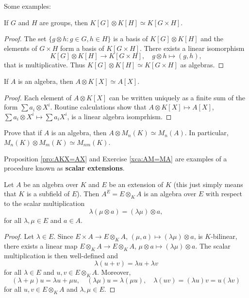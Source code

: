 Some examples:

\begin{proposition}
	If $G$ and $H$ are groups, then $K[G]\otimes K[H]\simeq K[G\times H]$.
\end{proposition}

\begin{proof}
	The set $\{g\otimes h:g\in G,h\in H\}$ is a basis of $K[G]\otimes K[H]$ and 
	the elements of $G\times H$ form a basis of $K[G\times H]$. There exists a linear isomorphism 
	\[
	K[G]\otimes K[H]\to K[G\times H], 
	\quad 
	g\otimes h\mapsto (g,h),
	\]
	that is multiplicative. Thus $K[G]\otimes K[H]\simeq K[G\times H]$
	as algebras. 
\end{proof}

\begin{proposition}
\label{pro:AKX=AX}
	If $A$ is an algebra, then $A\otimes K[X]\simeq A[X]$.	
\end{proposition}

\begin{proof}
	Each element of $A\otimes K[X]$ can be written uniquely as a finite sum of
	the form $\sum a_i\otimes X^i$. Routine calculations show that 
	$A\otimes K[X]\mapsto A[X]$, $\sum a_i\otimes X^i\mapsto \sum a_iX^i$, is a 
	linear algebra isomprhism. 
\end{proof}

\begin{exercise}
\label{xca:AM=MA}
	Prove that if $A$ is an algebra, then $A\otimes M_n(K)\simeq M_n(A)$. In
	particular, $M_n(K)\otimes M_m(K)\simeq M_{nm}(K)$.
\end{exercise}

Proposition \ref{pro:AKX=AX} and Exercise \ref{xca:AM=MA} 
are examples of a procedure known as \textbf{scalar extensions}. 

\begin{theorem}
	Let $A$ be an algebra over $K$ and $E$ be an extension of $K$ (this just simply means that
	$K$ is a subfield of $E$). Then 
	$A^E=E\otimes_KA$ is an algebra over $E$ with respect to
	the scalar multiplication 
	\[
		\lambda(\mu\otimes a)=(\lambda\mu)\otimes a,
	\]
	for all $\lambda,\mu\in E$ and $a\in A$.
\end{theorem}

\begin{proof}
	Let $\lambda\in E$. Since $E\times A\to E\otimes_KA$,
	$(\mu,a)\mapsto (\lambda\mu)\otimes a$, is $K$-bilinear, there exists 
	a linear map $E\otimes_KA\to E\otimes_KA$, $\mu\otimes a\mapsto
	(\lambda\mu)\otimes a$. The scalar multiplication is then well-defined and 
	\[
	\lambda(u+v)=\lambda u+\lambda v
	\]
	for all $\lambda\in E$ and $u,v\in E\otimes_KA$. Moreover, 
	\[
	(\lambda+\mu)u=\lambda u+\mu u,
	\quad
	(\lambda\mu)u=\lambda(\mu u),
	\quad
	\lambda(uv)=(\lambda u)v=u(\lambda v)
	\]
	for all $u,v\in E\otimes_KA$ and $\lambda,\mu\in E$.
\end{proof}

